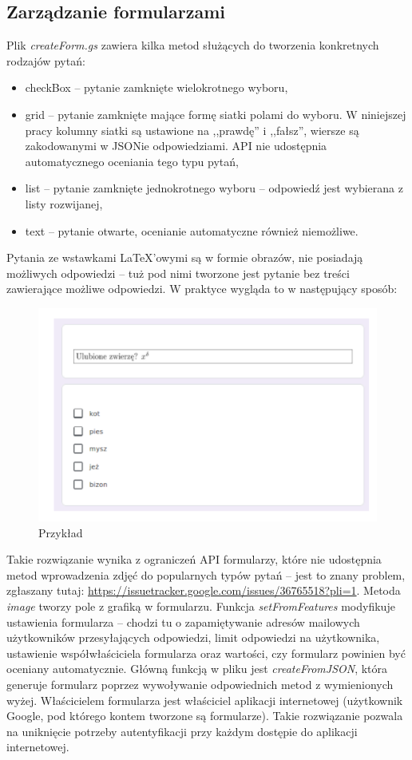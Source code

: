 \subsection{Zarządzanie formularzami}
Plik \textit{createForm.gs} zawiera kilka metod służących do tworzenia konkretnych rodzajów pytań:
\begin{itemize}
\item checkBox -- pytanie zamknięte wielokrotnego wyboru,
\item grid -- pytanie zamknięte mające formę siatki polami do wyboru. W niniejszej pracy kolumny siatki są ustawione na ,,prawdę'' i ,,fałsz'', wiersze są zakodowanymi w JSONie odpowiedziami. API nie udostępnia automatycznego oceniania tego typu pytań,
\item list -- pytanie zamknięte jednokrotnego wyboru -- odpowiedź jest wybierana z listy rozwijanej,
\item text -- pytanie otwarte, ocenianie automatyczne również niemożliwe.

\end{itemize}
Pytania ze wstawkami \LaTeX{}'owymi są w formie obrazów, nie posiadają możliwych odpowiedzi -- tuż pod nimi tworzone jest pytanie bez treści zawierające możliwe odpowiedzi. W praktyce wygląda to w następujący sposób:
\begin{figure}[H]
  \includegraphics[scale=0.75]{przyklad.png}
  \caption{Przykład}
  \label{fig:1}
\end{figure}
Takie rozwiązanie wynika z ograniczeń  API formularzy, które nie udostępnia metod wprowadzenia zdjęć do popularnych typów pytań -- jest to znany problem, zgłaszany tutaj: \href{https://issuetracker.google.com/issues/36765518?pli=1}{https://issuetracker.google.com/issues/36765518?pli=1}. Metoda \textit{image} tworzy pole z grafiką w formularzu. 
Funkcja \textit{setFromFeatures} modyfikuje ustawienia formularza -- chodzi tu o zapamiętywanie adresów mailowych użytkowników przesyłających odpowiedzi, limit odpowiedzi na użytkownika, ustawienie współwłaściciela formularza oraz wartości, czy formularz powinien być oceniany automatycznie.
\ind Główną funkcją w pliku jest \textit{createFromJSON}, która generuje formularz poprzez wywoływanie odpowiednich metod z wymienionych wyżej. Właścicielem formularza jest właściciel aplikacji internetowej (użytkownik Google, pod którego  kontem tworzone są formularze). Takie rozwiązanie pozwala na uniknięcie potrzeby autentyfikacji przy każdym dostępie do aplikacji internetowej.

